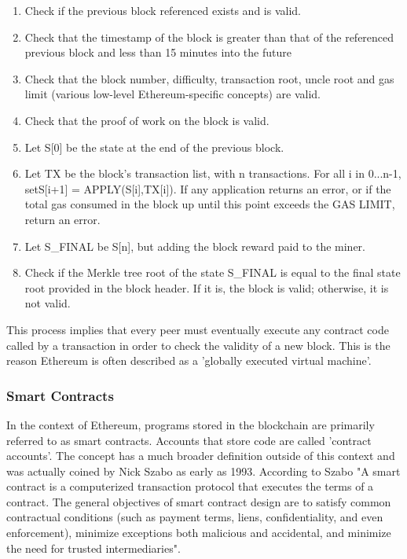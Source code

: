 \begin{enumerate}
\item Check if the previous block referenced exists and is valid.


\item Check that the timestamp of the block is greater than that of the referenced previous block and less than 15 minutes into the future


\item Check that the block number, difficulty, transaction root, uncle root and gas limit (various low-level Ethereum-specific concepts) are valid.


\item Check that the proof of work on the block is valid.


\item Let S[0] be the state at the end of the previous block.


\item Let TX be the block's transaction list, with n transactions. For all i in 0...n-1, setS[i+1] = APPLY(S[i],TX[i]). If any application returns an error, or if the total gas consumed in the block up until this point exceeds the GAS LIMIT, return an error.


\item Let S\_FINAL be S[n], but adding the block reward paid to the miner.


\item Check if the Merkle tree root of the state S\_FINAL is equal to the final state root provided in the block header. If it is, the block is valid; otherwise, it is not valid.

\end{enumerate}

This process implies that every peer must eventually execute any contract code called by a transaction in order to check the validity of a new block. This is the reason Ethereum is often described as a 'globally executed virtual machine'.

\subsubsection{Smart Contracts}
In the context of Ethereum, programs stored in the blockchain are primarily referred to as smart contracts. Accounts that store code are called 'contract accounts'. The concept has a much broader definition outside of this context and was actually coined by Nick Szabo as early as 1993. According to Szabo "A smart contract is a computerized transaction protocol that executes the terms of a contract. The general objectives of smart contract design are to satisfy common contractual conditions (such as payment terms, liens, confidentiality, and even enforcement), minimize exceptions both malicious and accidental, and minimize the need for trusted intermediaries"\cite{SmartContract}. \\

